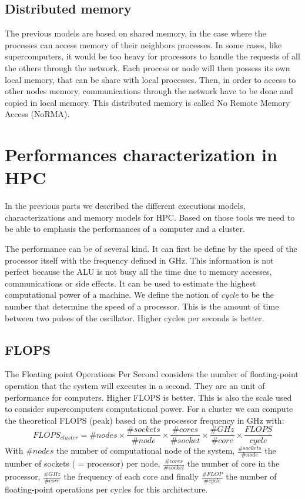 \subsection{Distributed memory}
The previous models are based on shared memory, in the case where the processes can access memory of their neighbors processes. 
In some cases, like supercomputers, it would be too heavy for processors to handle the requests of all the others through the network. 
Each process or node will then possess its own local memory, that can be share with local processes. 
Then, in order to access to other nodes memory, communications through the network have to be done and copied in local memory. 
This distributed memory is called No Remote Memory Access (NoRMA).

\section{Performances characterization in HPC}
In the previous parts we described the different executions models, characterizations and memory models for HPC. 
Based on those tools we need to be able to emphasis the performances of a computer and a cluster. 

The performance can be of several kind. 
It can first be define by the speed of the processor itself with the frequency defined in GHz. 
This information is not perfect because the ALU is not busy all the time due to memory accesses, communications or side effects. 
It can be used to estimate the highest computational power of a machine. 
We define the notion of \textit{cycle} to be the number that determine the speed of a processor. 
This is the amount of time between two pulses of the oscillator. 
Higher cycles per seconds is better. 

\subsection{FLOPS}

The Floating point Operations Per Second considers the number of floating-point operation that the system will executes in a second. 
They are an unit of performance for computers. 
Higher FLOPS is better. 
This is also the scale used to consider supercomputers computational power. 
For a cluster we can compute the theoretical FLOPS (peak) based on the processor frequency in GHz with:
\begin{equation}
FLOPS_{cluster} = \#nodes \times \frac{\#sockets}{\#node} \times \frac{\#cores}{\#socket} \times \frac{\#GHz}{\#core} \times \frac{FLOPS}{cycle}
\end{equation}
With $\#nodes$ the number of computational node of the system, $\frac{\#sockets}{\#node}$ the number of sockets ( = processor) per node, $\frac{\#cores}{\#socket}$ the number of core in the processor, $\frac{\#GHz}{\#core}$ the frequency of each core and finally $\frac{\#FLOP}{\#cycle}$ the number of floating-point operations per cycles for this architecture. 


